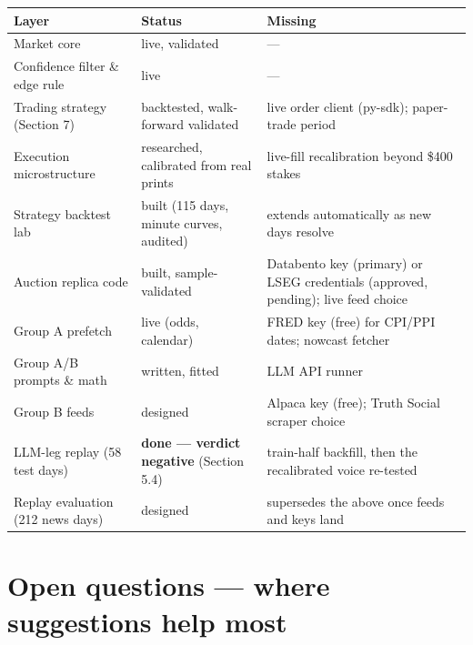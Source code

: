 \documentclass[11pt,a4paper]{article}
\begin{document}
\begin{center}
\begin{tabular}{llp{6.2cm}}
\toprule
Layer & Status & Missing \\
\midrule
Market core & live, validated & --- \\
Confidence filter \& edge rule & live & --- \\
Trading strategy (Section 7) & backtested, walk-forward validated & live order client (py-sdk); paper-trade period \\
Execution microstructure & researched, calibrated from real prints & live-fill recalibration beyond \$400 stakes \\
Strategy backtest lab & built (115 days, minute curves, audited) & extends automatically as new days resolve \\
Auction replica code & built, sample-validated & Databento key (primary) or LSEG credentials (approved, pending); live feed choice \\
Group A prefetch & live (odds, calendar) & FRED key (free) for CPI/PPI dates; nowcast fetcher \\
Group A/B prompts \& math & written, fitted & LLM API runner \\
Group B feeds & designed & Alpaca key (free); Truth Social scraper choice \\
LLM-leg replay (58 test days) & \textbf{done --- verdict negative} (Section 5.4) & train-half backfill, then the recalibrated voice re-tested \\
Replay evaluation (212 news days) & designed & supersedes the above once feeds and keys land \\
\bottomrule
\end{tabular}
\end{center}

\section{Open questions --- where suggestions help most}
\end{document}

